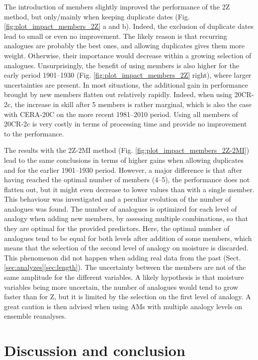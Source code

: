\documentclass{ametsoc}
\begin{document}
The introduction of members slightly improved the performance of the 2Z method, but only/mainly when keeping duplicate dates (Fig. \ref{fig:plot_impact_members_2Z} a and b). Indeed, the exclusion of duplicate dates lead to small or even no improvement. The likely reason is that recurring analogues are probably the best ones, and allowing duplicates gives them more weight. Otherwise, their importance would decrease within a growing selection of analogues. Unsurprisingly, the benefit of using members is also higher for the early period 1901--1930 (Fig. \ref{fig:plot_impact_members_2Z} right), where larger uncertainties are present. In most situations, the additional gain in performance brought by new members flatten out relatively rapidly. Indeed, when using 20CR-2c, the increase in skill after 5 members is rather marginal, which is also the case with CERA-20C on the more recent 1981--2010 period. Using all members of 20CR-2c is very costly in terms of processing time and provide no improvement to the performance. 

The results with the 2Z-2MI method (Fig. \ref{fig:plot_impact_members_2Z-2MI}) lead to the same conclusions in terms of higher gains when allowing duplicates and for the earlier 1901--1930 period. However, a major difference is that after having reached the optimal number of members (4--5), the performance does not flatten out, but it might even decrease to lower values than with a single member. This behaviour was investigated and a peculiar evolution of the number of analogues was found. The number of analogues is optimized for each level of analogy when adding new members, by assessing multiple combinations, so that they are optimal for the provided predictors. Here, the optimal number of analogues tend to be equal for both levels after addition of some members, which means that the selection of the second level of analogy on moisture is discarded. This phenomenon did not happen when adding real data from the past (Sect. \ref{sec:analyzes}\ref{sec:length}). The uncertainty between the members are not of the same amplitude for the different variables. A likely hypothesis is that moisture variables being more uncertain, the number of analogues would tend to grow faster than for Z, but it is limited by the selection on the first level of analogy. A great caution is then advised when using AMs with multiple analogy levels on ensemble reanalyses.


\section{Discussion and conclusion}
\end{document}
